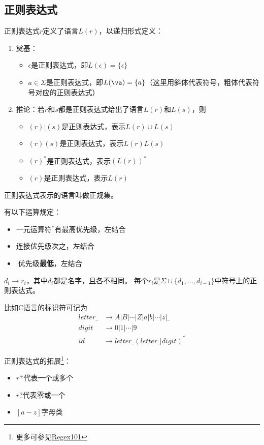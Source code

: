 \subsection{正则表达式}
\begin{definition}
正则表达式$r$定义了语言$L(r)$，以递归形式定义：
\begin{enumerate}
	\item 奠基：
	\begin{itemize}
		\item $\epsilon$是正则表达式，即$L(\epsilon)=\{\epsilon\}$
		\item $a\in\Sigma$是正则表达式，即$L(\va)=\{a\}$（这里用斜体代表符号，粗体代表符号对应的正则表达式）
	\end{itemize}
	\item 推论：若$r$和$s$都是正则表达式给出了语言$L(r)$和$L(s)$，则
	\begin{itemize}
		\item $(r)|(s)$是正则表达式，表示$L(r)\cup L(s)$
		\item $(r)(s)$是正则表达式，表示$L(r)L(s)$
		\item $(r)^*$是正则表达式，表示$(L(r))^*$
		\item $(r)$是正则表达式，表示$L(r)$
	\end{itemize}
\end{enumerate}
正则表达式表示的语言叫做正规集。
\end{definition}

有以下运算规定：
\begin{itemize}
	\item 一元运算符${}^*$有最高优先级，左结合
	\item 连接优先级次之，左结合
	\item $|$优先级\textbf{最低}，左结合
\end{itemize}

\begin{definition}[正则定义]
$d_i\to r_i$，其中$d_i$都是名字，且各不相同。
每个$r_i$是$\Sigma\cup\{d_1,\ldots,d_{i-1}\}$中符号上的正则表达式。
\end{definition}
\begin{example}
比如C语言的标识符可记为
\[\begin{aligned}
letter\_ &\to A|B|\cdots|Z|a|b|\cdots|z|\_\\
digit &\to 0|1|\cdots|9\\
id &\to letter\_(letter\_|digit)^*
\end{aligned}\]
\end{example}

正则表达式的拓展\footnote{更多可参见\href{https://regex101.com/}{Regex101}}：
\begin{itemize}
	\item $r^+$代表一个或多个
	\item $r?$代表零或一个
	\item $[a-z]$字母类
\end{itemize}
